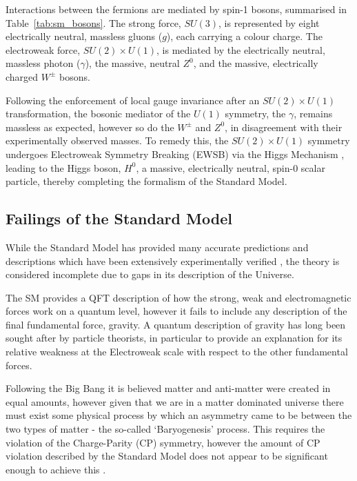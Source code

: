 Interactions between the fermions are mediated by spin-1 bosons, summarised in
Table~\ref{tab:sm_bosons}. The strong 
force, $SU(3)$, is represented by eight electrically neutral, massless gluons 
($g$), each carrying a colour charge. The electroweak force, $SU(2)\times U(1)$,
is
mediated by the electrically neutral, massless photon ($\gamma$), the massive,
neutral $Z^0$, and the massive, electrically charged $W^{\pm}$ bosons.

Following the enforcement of local gauge invariance after an
$SU(2)\times U (1)$ transformation,
the bosonic mediator of the $U(1)$ symmetry, the $\gamma$, remains massless as
expected, however so do the $W^{\pm}$ and $Z^0$, in disagreement with their
experimentally observed masses. To remedy this, the $SU(2)\times U(1)$ symmetry
undergoes Electroweak Symmetry Breaking (EWSB) via the Higgs Mechanism
\cite{PhysRevLett.13.321,PhysRevLett.13.508,PhysRevLett.13.585}, 
leading to the Higgs boson, $H^0$, a massive, electrically neutral, spin-0
scalar particle, thereby completing the formalism of the Standard Model.



\subsection{Failings of the Standard Model}

While the Standard Model has provided many accurate predictions and descriptions
which have been extensively experimentally verified \cite{Baak:2014ora}, the
theory is considered incomplete due to gaps in its description of the Universe.

The SM provides a QFT description of how the strong, weak and electromagnetic
forces work on a quantum level, however it fails to include any description of
the final fundamental force, gravity. A quantum description of gravity has long
been sought after by particle theorists, in particular to provide an explanation
for its relative weakness at the Electroweak scale with respect to the other
fundamental forces.

Following the Big Bang it is believed matter and anti-matter were created in
equal amounts, however given that we are in a matter dominated universe there
must exist some physical process by which an asymmetry came to be between the
two types of matter - the so-called `Baryogenesis' process. This requires the
violation of the Charge-Parity (CP) symmetry,
however the amount of CP violation described by the Standard Model
does not appear to be significant enough to achieve this
\cite{Riotto:1999yt, Hou:2008xd}.

